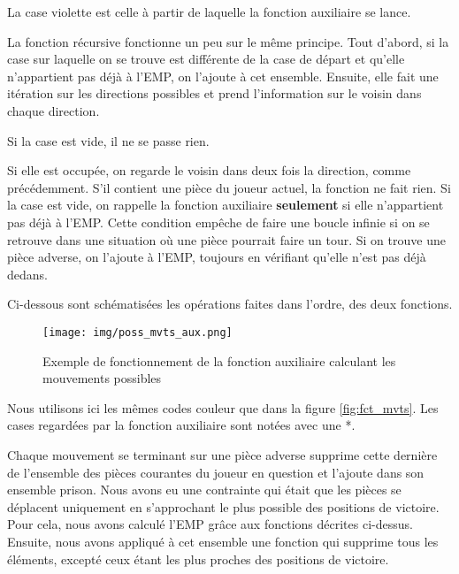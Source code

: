 \documentclass[a4paper]{article}
\begin{document}
\vspace{0.5cm}

La case violette est celle à partir de laquelle la fonction auxiliaire se lance.

\vspace{0.5cm}

La fonction récursive fonctionne un peu sur le même principe. Tout d'abord, si la case sur laquelle on se trouve est différente de la case de départ et qu'elle n'appartient pas déjà à l'EMP, on l'ajoute à cet ensemble. Ensuite, elle fait une itération sur les directions possibles et prend l'information sur le voisin dans chaque direction.

Si la case est vide, il ne se passe rien.

Si elle est occupée, on regarde le voisin dans deux fois la direction, comme précédemment. S'il contient une pièce du joueur actuel, la fonction ne fait rien. Si la case est vide, on rappelle la fonction auxiliaire \large\textbf{seulement} \normalsize si elle n'appartient pas déjà à l'EMP. Cette condition empêche de faire une boucle infinie si on se retrouve dans une situation où une pièce pourrait faire un tour. Si on trouve une pièce adverse, on l'ajoute à l'EMP, toujours en vérifiant qu'elle n'est pas déjà dedans.

Ci-dessous sont schématisées les opérations faites dans l'ordre, des deux fonctions.

\begin{figure}[H]
  \centering
  \texttt{[image: img/poss\_mvts\_aux.png]}
  \caption{Exemple de fonctionnement de la fonction auxiliaire calculant les mouvements possibles}
  \label{fig:fct_mvts_aux}
\end{figure}

Nous utilisons ici les mêmes codes couleur que dans la figure \ref{fig:fct_mvts}. Les cases regardées par la fonction auxiliaire sont notées avec une *.

\vspace{0.5cm}

Chaque mouvement se terminant sur une pièce adverse supprime cette dernière de l'ensemble des pièces courantes du joueur en question et l'ajoute dans son ensemble prison.
Nous avons eu une contrainte qui était que les pièces se déplacent uniquement en s'approchant le plus possible des positions de victoire. Pour cela, nous avons calculé l'EMP grâce aux fonctions décrites ci-dessus. Ensuite, nous avons appliqué à cet ensemble une fonction qui supprime tous les éléments, excepté ceux étant les plus proches des positions de victoire.
\end{document}
